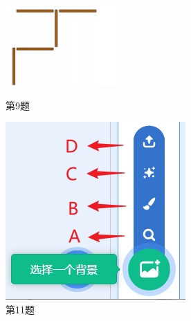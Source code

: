 \documentclass[10.5pt, a4paper]{article}
\begin{document}
\begin{enumerate}
\begin{figure}[htbp]
\begin{minipage}[t]{.2\textwidth}
                \includegraphics[width=\textwidth]{9.png}
                \caption*{第9题}
            \end{minipage}
            \begin{minipage}[t]{.14\textwidth}
                \centering
                \includegraphics[width=\textwidth]{11.png}
                \caption*{第11题}
            \end{minipage}
            \begin{minipage}[t]{.21\textwidth}

\end{minipage}
\end{figure}
\end{enumerate}
\end{document}
